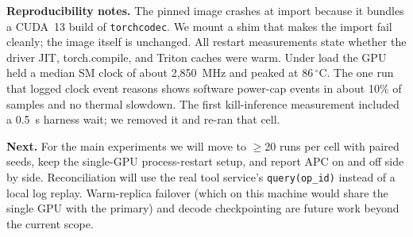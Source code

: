 \textbf{Reproducibility notes.} The pinned image crashes at import because it bundles a CUDA~13 build of \texttt{torchcodec}. We mount a shim that makes the import fail cleanly; the image itself is unchanged. All restart measurements state whether the driver JIT, torch.compile, and Triton caches were warm. Under load the GPU held a median SM clock of about 2{,}850~MHz and peaked at 86\,$^\circ$C. The one run that logged clock event reasons shows software power-cap events in about 10\% of samples and no thermal slowdown. The first kill-inference measurement included a 0.5~s harness wait; we removed it and re-ran that cell.

\textbf{Next.} For the main experiments we will move to $\ge$20 runs per cell with paired seeds, keep the single-GPU process-restart setup, and report APC on and off side by side. Reconciliation will use the real tool service's \texttt{query(op\_id)} instead of a local log replay. Warm-replica failover (which on this machine would share the single GPU with the primary) and decode checkpointing are future work beyond the current scope.
